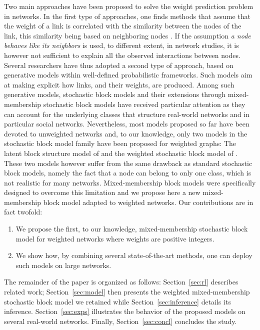 Two main approaches have been proposed to solve the weight prediction problem \cite{Lu2011} in networks. In the first type of approaches, one finds methods that assume that the weight of a link is correlated with the similarity between the nodes of the link, this similarity being based on neighboring nodes \cite{Zhao2015,Zhu2016}. If the assumption \textit{a node behaves like its neighbors} is used, to different extent, in network studies, it is however not sufficient to explain all the observed interactions between nodes. Several researchers have thus adopted a second type of approach, based on generative models within well-defined probabilistic frameworks. Such models aim at making explicit how links, and their weights, are produced. Among such generative models, stochastic block models and their extensions through mixed-membership stochastic block models have received particular attention \cite{ Karrer2011,airoldi2009mixed,iMMSB,fan2015dynamic} as they can account for the underlying classes that structure real-world networks and in particular social networks. Nevertheless, most models proposed so far have been devoted to unweighted networks and, to our knowledge, only two models in the stochastic block model family have been proposed for weighted graphs: The latent block structure model of \cite{aicher2014learning} and the weighted stochastic block model of \cite{peixoto2018nonparametric}. These two models however suffer from the same drawback as standard stochastic block models, namely the fact that a node can belong to only one class, which is not realistic for many networks. Mixed-membership block models were specifically designed to overcome this limitation and we propose here a new mixed-membership block model adapted to weighted networks. Our contributions are in fact twofold:
%
\begin{enumerate}
\item We propose the first, to our knowledge, mixed-membership stochastic block model for weighted networks where weights are positive integers.
\item We show how, by combining several state-of-the-art methods, one can deploy such models on large networks.
\end{enumerate}
%
The remainder of the paper is organized as follows: Section~\ref{sec:rl} describes related work; Section~\ref{sec:model} then presents the weighted mixed-membership stochastic block model we retained while Section~\ref{sec:inference} details its inference. Section~\ref{sec:exps} illustrates the behavior of the proposed models on several real-world networks. Finally, Section~\ref{sec:concl} concludes the study.


